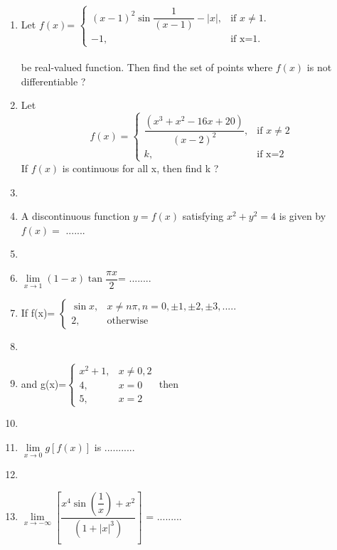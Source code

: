 \renewcommand{\theequation}{\theenumi}
\begin{enumerate}[label=\arabic*.,ref=\thesubsection.\theenumi]

\item Let $f(x)$=\resizebox{.33 \textwidth}{!} 
{$\begin{cases}
(x-1)^2\sin \dfrac{1}{(x-1)} - |x|,& \text{if $x\ne 1$}. \\
-1, & \text{if x=1}.
\end{cases}$} \\ 
\\be real-valued function. Then find the set of points where $f(x)$ is not differentiable ?

\item Let\begin{equation*}
f(x)=\begin{cases}
\dfrac{\left(x^3+x^2-16x+20\right)}{\left(x-2\right)^2}, &\text{if $x\ne 2$}\\
k, & \text{if x=2}
\end{cases}
\end{equation*}
If $f(x)$ is continuous for all x, then find k ?

\item[~]\item A discontinuous function $y=f(x)$ satisfying $x^2+y^2=4$ is given by $f(x)=$ .......

\item[~]\item
$\lim\limits_{x \to 1}\left(1-x\right)\tan\dfrac{\pi x}{2} $= ........

\item If f(x)=\resizebox{.34 \textwidth}{!} 
{$\begin{cases}\sin x, & \text{$x \ne n\pi$}, n=0,\pm 1, \pm 2, \pm 3, .....\\ 
2, & \text{otherwise} \end{cases}$} \item[~]\item[~]and g(x)=$\begin{cases}x^2+1, & \text{$x\ne 0,2$}\\ 4,& \text{$x=0$}\\ 5,& \text{$x=2$}\end{cases}$
then \item[~]\item[~]$\lim\limits_{x \to 0}g\left[f(x)\right]$ is ...........

\item[~]\item $\lim\limits_{x \to -\infty}\left[\dfrac{x^4\sin \left(\dfrac{1}{x}\right)+x^2}{\left(1+|x|^3\right)}\right]$ = .........


\end{enumerate}
